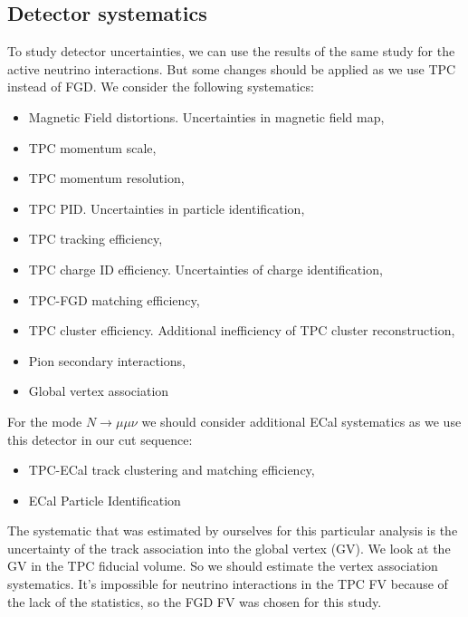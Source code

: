 \documentclass[../main.tex]{subfiles}
\begin{document}
\subsection{Detector systematics}
To study detector uncertainties, we can use the results of the same study for the active neutrino interactions. But some changes should be applied as we use TPC instead of FGD. We consider the following systematics:
\begin{itemize}
    \item Magnetic Field distortions. Uncertainties in magnetic field map,
    \item TPC momentum scale,
    \item TPC momentum resolution,
    \item TPC PID. Uncertainties in particle identification,
    \item TPC tracking efficiency,
    \item TPC charge ID efficiency. Uncertainties of charge identification,
    \item TPC-FGD matching efficiency,
    \item TPC cluster efficiency. Additional inefficiency of TPC cluster reconstruction,
    \item Pion secondary interactions,
    \item Global vertex association
\end{itemize}

For the mode $N\to\mu\mu\nu$ we should consider additional ECal systematics as we use this detector in our cut sequence:

\begin{itemize}
    \item TPC-ECal track clustering and matching efficiency,
    \item ECal Particle Identification
\end{itemize}



The systematic that was estimated by ourselves for this particular analysis is the uncertainty of the track association into the global vertex (GV). We look at the GV in the TPC fiducial volume. So we should estimate the vertex association systematics. It's impossible for neutrino interactions in the TPC FV because of the lack of the statistics, so the FGD FV was chosen for this study.
\end{document}
